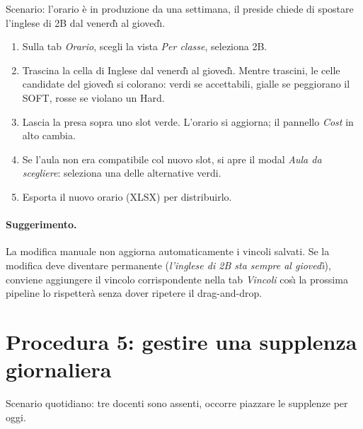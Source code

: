 Scenario: l'orario \`e in produzione da una settimana, il
preside chiede di spostare l'inglese di 2B dal venerd\`{\i} al
gioved\`{\i}.

\begin{enumerate}
\item Sulla tab \emph{Orario}, scegli la vista \emph{Per
  classe}, seleziona 2B.
\item Trascina la cella di Inglese dal venerd\`{\i} al
  gioved\`{\i}. Mentre trascini, le celle candidate del
  gioved\`{\i} si colorano: verdi se accettabili, gialle se
  peggiorano il SOFT, rosse se violano un Hard.
\item Lascia la presa sopra uno slot verde. L'orario si
  aggiorna; il pannello \emph{Cost} in alto cambia.
\item Se l'aula non era compatibile col nuovo slot, si apre
  il modal \emph{Aula da scegliere}: seleziona una delle
  alternative verdi.
\item Esporta il nuovo orario (XLSX) per distribuirlo.
\end{enumerate}

\paragraph{Suggerimento.} La modifica manuale non aggiorna
automaticamente i vincoli salvati. Se la modifica deve
diventare permanente (\emph{l'inglese di 2B sta sempre al
gioved\`{\i}}), conviene aggiungere il vincolo corrispondente
nella tab \emph{Vincoli} cos\`{\i} la prossima pipeline lo
rispetter\`a senza dover ripetere il drag-and-drop.


\section{Procedura 5: gestire una supplenza giornaliera}
\label{sec:wf_supplenza}

Scenario quotidiano: tre docenti sono assenti, occorre
piazzare le supplenze per oggi.

